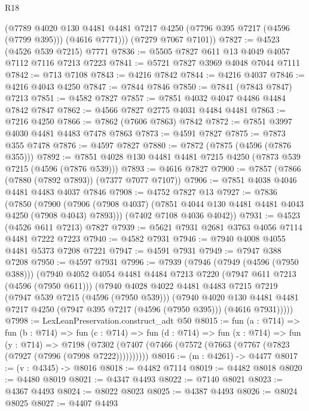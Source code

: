 \begin{lexlean}{R18}
\begin{coremodule}
        (@7789
          @4020
          @130
          @4481
          @4481
          @7217
          @4250
          (@7796 @395 @7217 (@4596 (@7799 @395)))
          (@4616 @7771)))
      (@7279 @7067 @7101))
@7827 := @4523 (@4526 @539 @7215) @7771
@7836 := @5505 @7827 @611 @13 @4049 @4057 @7112 @7116 @7213 @7223
@7841 := @5721 @7827 @3969 @4048 @7044 @7111
@7842 := @713 @7108
@7843 := @4216 @7842
@7844 := @4216 @4037
@7846 := @4216 @4043 @4250
@7847 := @7844 @7846
@7850 := @7841 (@7843 @7847) @7213
@7851 := @4582 @7827
@7857 := @7851 @4032 @4047 @4486 @4484 @7842 @7847
@7862 := @4566 @7827 @2775 @4031 @4484 @4481
@7863 := @7216 @4250
@7866 := @7862 (@7606 @7863) @7842
@7872 := @7851 @3997 @4030 @4481 @4483 @7478 @7863
@7873 := @4591 @7827
@7875 := @7873 @355 @7478
@7876 := @4597 @7827
@7880 := @7872 (@7875 (@4596 (@7876 @355)))
@7892 := @7851 @4028 @130 @4481 @4481 @7215 @4250 (@7873 @539 @7215 (@4596 (@7876 @539)))
@7893 := @4616 @7827
@7900 := @7857 (@7866 (@7880 (@7892 @7893)) (@7377 @7077 @7107))
@7906 := @7851 @4038 @4046 @4481 @4483 @4037 @7846
@7908 := @4752 @7827 @13
@7927 := @7836
    (@7850
      (@7900 (@7906 (@7908 @4037) (@7851 @4044 @130 @4481 @4481 @4043 @4250 (@7908 @4043) @7893)))
      (@7402 @7108 @4036 @4042))
@7931 := @4523 (@4526 @611 @7213) @7827
@7939 := @5621 @7931 @2681 @3763 @4056 @7114 @4481 @7222 @7223
@7940 := @4582 @7931
@7946 := @7940 @4008 @4055 @4481 @5373 @7208 @7221
@7947 := @4591 @7931
@7949 := @7947 @388 @7208
@7950 := @4597 @7931
@7996 := @7939
    (@7946
      (@7949 (@4596 (@7950 @388)))
      (@7940
        @4052
        @4054
        @4481
        @4484
        @7213
        @7220
        (@7947 @611 @7213 (@4596 (@7950 @611)))
        (@7940
          @4028
          @4022
          @4481
          @4483
          @7215
          @7219
          (@7947 @539 @7215 (@4596 (@7950 @539)))
          (@7940
            @4020
            @130
            @4481
            @4481
            @7217
            @4250
            (@7947 @395 @7217 (@4596 (@7950 @395)))
            (@4616 @7931)))))
@7998 := LexLeanPreservation.construct_adt @50
@8015 := fun (a : @714) =>
  fun (b : @714) =>
  fun (c : @714) =>
  fun (d : @714) =>
  fun (x : @714) =>
  fun (y : @714) =>
  @7198 (@7302 (@7407 (@7466 (@7572 (@7663 (@7767 (@7823 (@7927 (@7996 (@7998 @7222))))))))))
@8016 := (m : @4261) -> @4477
@8017 := (v : @4345) -> @8016
@8018 := @4482 @7114
@8019 := @4482 @8018
@8020 := @4480 @8019
@8021 := @4347 @4493
@8022 := @7140 @8021
@8023 := @4367 @4493
@8024 := @8022 @8023
@8025 := @4387 @4493
@8026 := @8024 @8025
@8027 := @4407 @4493

\end{coremodule}
\end{lexlean}
